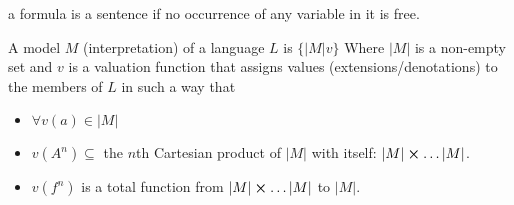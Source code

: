 \begin{definition}[Sentence]
a formula is a sentence if no occurrence of any variable in it is free.
\end{definition}


\begin{definition}[Model]
A model $M$ (interpretation) of a language $L$ is $\{|M| v\}$ Where $|M|$ is a non-empty set and $v$ is a valuation function that assigns values (extensions/denotations) to the members of $L$ in such a way that 
\begin{itemize}
\item $\forall v(a) \in |M|$
\item $v(A^n) \subseteq$ the $n$th Cartesian product of $|M|$ with itself: $|M|\cross \dots |M|$.
\item $v(f^n)$ is a total function from $|M| \cross \dots |M|$ to $|M|$.
\end{itemize}
\end{definition}


